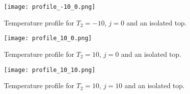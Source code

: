 \documentclass[10pt,a4paper,twocolumn]{article}
\begin{document}
\begin{figure}[!hb]
    \centering
    \texttt{[image: profile\_-10\_0.png]}
    \caption{Temperature profile for $T_2=-10$, $j=0$ and an isolated top.}
    \label{fig:profile_-10_0}
\end{figure}


\begin{figure}[!ht]
    \centering
    \texttt{[image: profile\_10\_0.png]}
    \caption{Temperature profile for $T_2=10$, $j=0$ and an isolated top.}
    \label{fig:profile_10_0}
\end{figure}

\begin{figure}[!hb]
    \centering
    \texttt{[image: profile\_10\_10.png]}
    \caption{Temperature profile for $T_2=10$, $j=10$ and an isolated top.}
    \label{fig:profile_10_10}
\end{figure}


\nocite{golden}
\printbibliography
\end{document}
